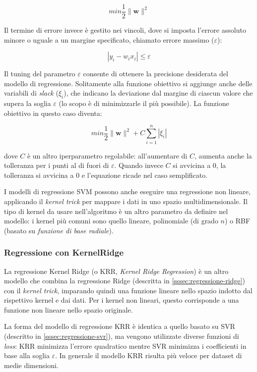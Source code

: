 $$min \frac{1}{2}\|\mathbf{w}\|^{2}$$\smallskip

 Il termine di errore invece è gestito nei vincoli, dove si imposta l'errore assoluto minore o uguale a un margine specificato, chiamato errore massimo ($\varepsilon$):
 
 $$\left|y_{i}-w_{i} x_{i}\right| \leq \varepsilon$$\smallskip
 
 Il tuning del parametro $\varepsilon$ consente di ottenere la precisione desiderata del modello di regressione. Solitamente alla funzione obiettivo si aggiunge anche delle variabili di \textit{slack} ($\xi_{i}$), che indicano la deviazione dal margine di ciascun valore che supera la soglia $\varepsilon$ (lo scopo è di minimizzarle il più possibile). La funzione obiettivo in questo caso diventa:
 
 $$min \frac{1}{2}\|\mathbf{w}\|^{2} + C \sum_{i=1}^{n}\left|\xi_{i}\right|$$\smallskip

dove $C$ è un altro iperparametro regolabile: all'aumentare di $C$, aumenta anche la tolleranza per i punti al di fuori di $\varepsilon$. Quando invece $C$ si avvicina a 0, la tolleranza si avvicina a 0 e l'equazione ricade nel caso semplificato.

I modelli di regressione SVM possono anche eseguire una regressione non lineare, applicando il \textit{kernel trick} per mappare i dati in uno spazio multidimensionale. Il tipo di kernel da usare nell'algoritmo è un altro parametro da definire nel modello: i kernel più comuni sono quello lineare, polinomiale (di grado $n$) o RBF (basato su \textit{funzione di base radiale}).

\subsubsection{Regressione con KernelRidge}\label{sssec:regressione-kridge}
La regressione Kernel Ridge (o KRR, \textit{Kernel Ridge Regression}) è un altro modello che combina la regressione Ridge (descritta in \ref{sssec:regressione-ridge}) con il \textit{kernel trick}, imparando quindi una funzione lineare nello spazio indotto dal rispettivo kernel e dai dati. Per i kernel non lineari, questo corrisponde a una funzione non lineare nello spazio originale. \cite{krr}

La forma del modello di regressione KRR è identica a quello basato su SVR (descritto in \ref{sssec:regressione-svr}), ma vengono utilizzate diverse funzioni di \textit{loss}: KRR minimizza l'errore quadratico mentre SVR minimizza i coefficienti in base alla soglia $\varepsilon$. In generale il modello KRR risulta più veloce per dataset di medie dimensioni. %


